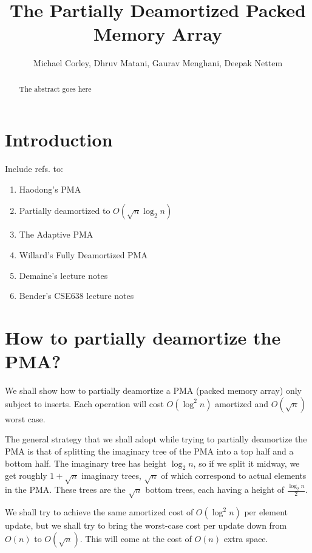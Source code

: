 \documentclass{article}
\title{The Partially Deamortized Packed Memory Array}
\author{Michael Corley, Dhruv Matani, Gaurav Menghani, Deepak Nettem}
\begin{document}
\maketitle

\begin{abstract}
  The abstract goes here
\end{abstract}

\clearpage

\section{Introduction}
Include refs. to:
\begin{enumerate}
\item Haodong's PMA
\item Partially deamortized to $O(\sqrt{n}\log_2{n})$
\item The Adaptive PMA
\item Willard's Fully Deamortized PMA
\item Demaine's lecture notes
\item Bender's CSE638 lecture notes
\end{enumerate}

\section{How to partially deamortize the PMA?}

We shall show how to partially deamortize a PMA (packed memory array)
only subject to inserts. Each operation will cost $O(\log^2{n})$
amortized and $O(\sqrt{n})$ worst case.

The general strategy that we shall adopt while trying to partially
deamortize the PMA is that of splitting the imaginary tree of the PMA
into a top half and a bottom half. The imaginary tree has height
$\log_2{n}$, so if we split it midway, we get roughly $1 +
\sqrt{n}$ imaginary trees, $\sqrt{n}$ of which correspond to actual
elements in the PMA. These trees are the $\sqrt{n}$ bottom trees, each
having a height of $\frac{\log_2{n}}{2}$.

We shall try to achieve the same amortized cost of $O(\log^2{n})$ per
element update, but we shall try to bring the worst-case cost per
update down from $O(n)$ to $O(\sqrt{n})$. This will come at the cost
of $O(n)$ extra space.
\end{document}
